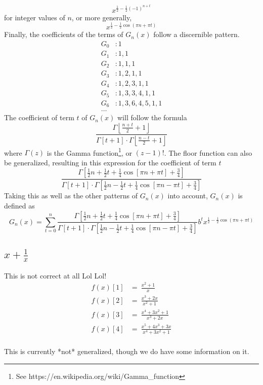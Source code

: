 \documentclass[12pt, letterpaper]{article}
\begin{document}
$$x^{\frac{1}{2}-\frac{1}{2}(-1)^{n+t}}$$
for integer values of $n$, or more generally,
$$x^{\frac{1}{2}-\frac{1}{2}\cos(\pi n+\pi t)}$$
Finally, the coefficients of the terms of $G_n(x)$ follow a discernible pattern.
\begin{equation}
    \begin{split}
        G_0 & : 1\\
        G_1 & : 1, 1\\
        G_2 & : 1, 1, 1\\
        G_3 & : 1, 2, 1, 1\\
        G_4 & : 1, 2, 3, 1, 1\\
        G_5 & : 1, 3, 3, 4, 1, 1\\
        G_6 & : 1, 3, 6, 4, 5, 1, 1\\
        \dots
    \end{split}
\end{equation}
The coefficient of term $t$ of $G_n(x)$ will follow the formula
$$\frac{\Gamma \left \lfloor \frac{n+t}{2} +1\right \rfloor}{\Gamma [t+1] \cdot \Gamma \left \lfloor \frac{n-t}{2} +1\right \rfloor}$$
where $\Gamma (z)$ is the Gamma function\footnote{See https://en.wikipedia.org/wiki/Gamma\_function}, or $(z-1)!$. The floor function can also be generalized, resulting in this expression for the coefficient of term $t$
$$\frac{\Gamma[\frac{1}{2}n+\frac{1}{2}t+\frac{1}{4}\cos[\pi n+\pi t]+\frac{3}{4}]}{\Gamma[t+1]\cdot \Gamma[\frac{1}{2}n-\frac{1}{2}t+\frac{1}{4}\cos[\pi n-\pi t]+\frac{3}{4}]}$$
Taking this as well as the other patterns of $G_n(x)$ into account, $G_n(x)$ is defined as
$$G_n(x) = \sum_{t=0}^{n}\frac{\Gamma[\frac{1}{2}n+\frac{1}{2}t+\frac{1}{4}\cos[\pi n+\pi t]+\frac{3}{4}]}{\Gamma[t+1]\cdot \Gamma[\frac{1}{2}n-\frac{1}{2}t+\frac{1}{4}\cos[\pi n-\pi t]+\frac{3}{4}]}b^{t}x^{\frac{1}{2}-\frac{1}{2}\cos(\pi n+\pi t)}$$

\subsection{$x + \frac{1}{x}$}
This is not correct at all Lol Lol!
\begin{equation}
    \begin{split}
        f(x)[1] & = \  \frac{x^2+1}{x}\\
        f(x)[2] & = \  \frac{x^3+2x}{x^2+1}\\
        f(x)[3] & = \  \frac{x^4+3x^2+1}{x^3+2x}\\
        f(x)[4] & = \ \frac{x^5+4x^3+3x}{x^4+3x^2+1}\\
    \end{split}
\end{equation}

This is currently *not* generalized, though we do have some information on it.
\end{document}
